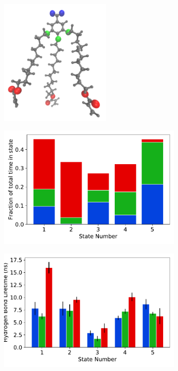 \documentclass[journal=jpcbfk,manuscript=article]{achemso}
\begin{document}
  \begin{figure}
  \centering
  \begin{subfigure}{0.475\textwidth}
  \centering
  \includegraphics[width=0.6\textwidth, angle=0]{monomer_oxygens.pdf}
  \caption{}\label{fig:monomer_oxygens}
  \end{subfigure}
  \begin{subfigure}{0.475\textwidth}
  \includegraphics[width=\textwidth]{hbond_fractions.pdf}
  \caption{}\label{fig:hbond_fractions}
  \end{subfigure}
  \begin{subfigure}{0.475\textwidth}
  \includegraphics[width=\textwidth]{hbond_lifetimes.pdf}

\end{subfigure}
\end{figure}
\end{document}
